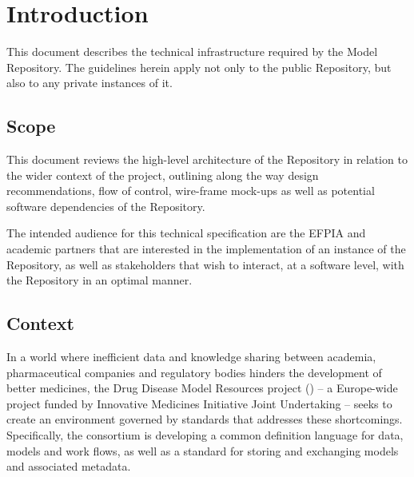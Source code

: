 \section{Introduction}
\label{introduction}
This document describes the technical infrastructure required by the \ddmore Model Repository. The guidelines herein apply not only to the public Repository, but also to any private instances of it.

\subsection{Scope}
\label{scope}
This document reviews the high-level architecture of the Repository in relation to the wider context of the project, outlining along the way design recommendations, flow of control, wire-frame mock-ups as well as potential software dependencies of the Repository.

The intended audience for this technical specification are the EFPIA and academic partners that are interested in the implementation of an instance of the Repository, as well as stakeholders that wish to interact, at a software level, with the Repository in an optimal manner.

\subsection{Context}
\label{context}
In a world where inefficient data and knowledge sharing between academia, pharmaceutical companies and regulatory bodies hinders the development of better medicines, the Drug Disease Model Resources project (\ddmore) -- a Europe-wide project funded by Innovative Medicines Initiative Joint Undertaking -- seeks to create an environment governed by standards that addresses these shortcomings. Specifically, the \ddmore consortium is developing a common definition language for data, models and work flows, as well as a standard for storing and exchanging \glspl{model} and associated \gls{metadata}\cite{ddmore:dow}.

